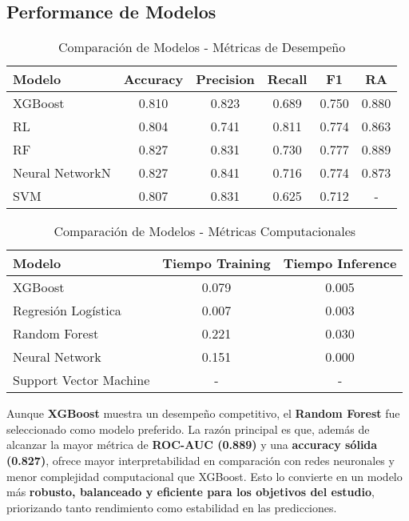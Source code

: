 \documentclass[sjournal]{IEEEtran}
\begin{document}
\subsection*{Performance de Modelos}
\begin{table}[H]
\centering
\caption{Comparación de Modelos - Métricas de Desempeño}
\label{tab:comparacion_modelos_desempeno}
\begin{tabular}{lccccc}
\toprule
\textbf{Modelo} & \textbf{Accuracy} & \textbf{Precision} & \textbf{Recall} & \textbf{F1} & \textbf{RA}\\
\midrule
XGBoost              & 0.810 & 0.823 & 0.689 & 0.750 & 0.880 \\
RL& 0.804 & 0.741 & 0.811 & 0.774 & 0.863 \\
RF& 0.827 & 0.831 & 0.730 & 0.777 & 0.889 \\
Neural NetworkN& 0.827 & 0.841 & 0.716 & 0.774 & 0.873 \\
SVM& 0.807 & 0.831 & 0.625 & 0.712 &   -   \\
\bottomrule
\end{tabular}
\end{table}

\begin{table}[H]
\centering
\caption{Comparación de Modelos - Métricas Computacionales}
\label{tab:comparacion_modelos_computo}
\begin{tabular}{lcc}
\toprule
\textbf{Modelo} & \textbf{Tiempo Training} & \textbf{Tiempo Inference} \\
\midrule
XGBoost              & 0.079 & 0.005 \\
Regresión Logística  & 0.007 & 0.003 \\
Random Forest        & 0.221 & 0.030 \\
Neural Network       & 0.151 & 0.000 \\
Support Vector Machine &   -   &   -   \\
\bottomrule
\end{tabular}
\end{table}

Aunque \textbf{XGBoost} muestra un desempeño competitivo, el \textbf{Random Forest} fue seleccionado como modelo preferido. La razón principal es que, además de alcanzar la mayor métrica de \textbf{ROC-AUC (0.889)} y una \textbf{accuracy sólida (0.827)}, ofrece mayor interpretabilidad en comparación con redes neuronales y menor complejidad computacional que XGBoost. Esto lo convierte en un modelo más \textbf{robusto, balanceado y eficiente para los objetivos del estudio}, priorizando tanto rendimiento como estabilidad en las predicciones.
\end{document}
